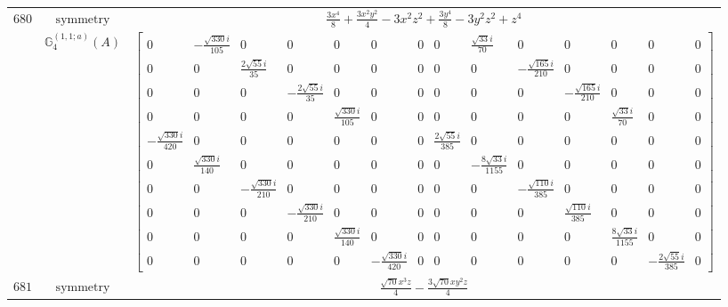 \documentclass[fleqn,8pt,landscape]{jsarticle}
\begin{document}
\begin{longtable}{ccc}
$ 680 $ & $ \text{symmetry} $ & $ \frac{3 x^{4}}{8} + \frac{3 x^{2} y^{2}}{4} - 3 x^{2} z^{2} + \frac{3 y^{4}}{8} - 3 y^{2} z^{2} + z^{4} $ \\
$  $ & $ \mathbb{G}_{4}^{(1,1;a)}(A) $ & $ \begin{bmatrix} 0 & - \frac{\sqrt{330} i}{105} & 0 & 0 & 0 & 0 & 0 & 0 & \frac{\sqrt{33} i}{70} & 0 & 0 & 0 & 0 & 0 \\ 0 & 0 & \frac{2 \sqrt{55} i}{35} & 0 & 0 & 0 & 0 & 0 & 0 & - \frac{\sqrt{165} i}{210} & 0 & 0 & 0 & 0 \\ 0 & 0 & 0 & - \frac{2 \sqrt{55} i}{35} & 0 & 0 & 0 & 0 & 0 & 0 & - \frac{\sqrt{165} i}{210} & 0 & 0 & 0 \\ 0 & 0 & 0 & 0 & \frac{\sqrt{330} i}{105} & 0 & 0 & 0 & 0 & 0 & 0 & \frac{\sqrt{33} i}{70} & 0 & 0 \\ - \frac{\sqrt{330} i}{420} & 0 & 0 & 0 & 0 & 0 & 0 & \frac{2 \sqrt{55} i}{385} & 0 & 0 & 0 & 0 & 0 & 0 \\ 0 & \frac{\sqrt{330} i}{140} & 0 & 0 & 0 & 0 & 0 & 0 & - \frac{8 \sqrt{33} i}{1155} & 0 & 0 & 0 & 0 & 0 \\ 0 & 0 & - \frac{\sqrt{330} i}{210} & 0 & 0 & 0 & 0 & 0 & 0 & - \frac{\sqrt{110} i}{385} & 0 & 0 & 0 & 0 \\ 0 & 0 & 0 & - \frac{\sqrt{330} i}{210} & 0 & 0 & 0 & 0 & 0 & 0 & \frac{\sqrt{110} i}{385} & 0 & 0 & 0 \\ 0 & 0 & 0 & 0 & \frac{\sqrt{330} i}{140} & 0 & 0 & 0 & 0 & 0 & 0 & \frac{8 \sqrt{33} i}{1155} & 0 & 0 \\ 0 & 0 & 0 & 0 & 0 & - \frac{\sqrt{330} i}{420} & 0 & 0 & 0 & 0 & 0 & 0 & - \frac{2 \sqrt{55} i}{385} & 0 \end{bmatrix} $ \\ \hline
$ 681 $ & $ \text{symmetry} $ & $ \frac{\sqrt{70} x^{3} z}{4} - \frac{3 \sqrt{70} x y^{2} z}{4} $ \\

\end{longtable}
\end{document}
